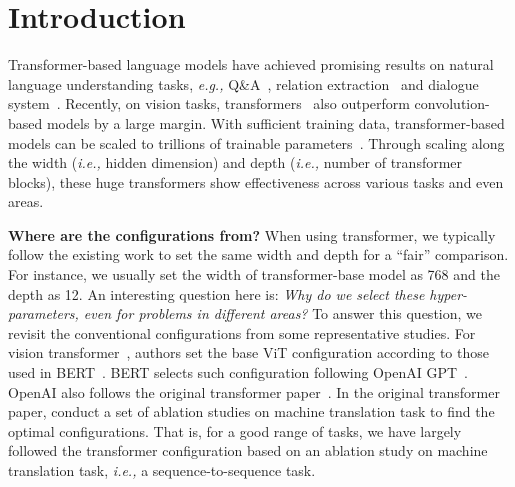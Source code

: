\documentclass{article}
\theoremstyle{plain}
\theoremstyle{definition}
\theoremstyle{remark}
\newcommand{\ie}{\emph{i.e.,}\xspace}
\newcommand{\eg}{\emph{e.g.,}\xspace}
\begin{document}
\section{Introduction}\label{Introduction}



Transformer-based language models have achieved promising results on natural language understanding tasks, \eg  Q\&A~\citep{qu2019bert,yang2020bert}, relation extraction~\citep{xue2020embarrassingly, zhou2020document} and dialogue system~\citep{ni2021recent}. Recently, on vision tasks, transformers~\citep{dosovitskiy2020image,zhou2021deepvit, xue2021go, xue2022one} also outperform convolution-based models by a large margin. With sufficient training data,  transformer-based models can be scaled to trillions of trainable parameters~\citep{fedus2021switch, du2021glam}. Through scaling along the width (\ie hidden dimension) and depth (\ie number of transformer blocks), these huge transformers show effectiveness across various tasks and even areas.






\textbf{Where are the configurations from?} When using transformer, we typically follow the existing work to set the same width and depth for a ``fair'' comparison. For instance, we usually set the width of transformer-base model as 768 and the depth as 12. An interesting question here is: \textit{Why do we select these hyper-parameters, even for problems in different areas?} To answer this question, we revisit the conventional configurations from some representative studies. For vision transformer~\citep{dosovitskiy2020image}, authors set the base ViT configuration according to those used in BERT~\citep{devlin2018bert}.  BERT selects such configuration following OpenAI GPT~\citep{radford2018improving}. OpenAI also follows the original transformer paper~\citep{vaswani2017attention}. In the original transformer paper, \citet{vaswani2017attention} conduct a set of ablation studies on machine translation task to find the optimal configurations. That is, for a good range of tasks, we have largely followed the transformer configuration based on an ablation study on machine translation task, \ie a sequence-to-sequence task.
\end{document}
